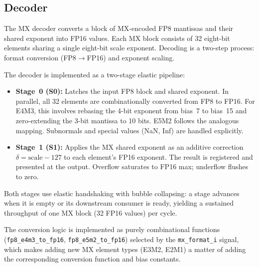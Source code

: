 \subsection{Decoder}
\label{ssec:mx-decoder}

The MX decoder converts a block of MX-encoded FP8 mantissas and their shared
exponent into FP16 values. Each MX block consists of 32 eight-bit elements
sharing a single eight-bit scale exponent. Decoding is a two-step process:
format conversion (FP8$\to$FP16) and exponent scaling.

The decoder is implemented as a two-stage elastic pipeline:

\begin{itemize}
    \item \textbf{Stage~0 (S0):} Latches the input FP8 block and shared
          exponent. In parallel, all 32 elements are combinationally converted
          from FP8 to FP16. For E4M3, this involves rebasing the 4-bit exponent
          from bias~7 to bias~15 and zero-extending the 3-bit mantissa to 10
          bits. E5M2 follows the analogous mapping. Subnormals and special values
          (NaN, Inf) are handled explicitly.
    \item \textbf{Stage~1 (S1):} Applies the MX shared exponent as an additive
          correction $\delta = \text{scale} - 127$ to each element's FP16
          exponent. The result is registered and presented at the output.
          Overflow saturates to FP16 max; underflow flushes to zero.
\end{itemize}

Both stages use elastic handshaking with bubble collapsing: a stage advances
when it is empty or its downstream consumer is ready, yielding a sustained
throughput of one MX block (32 FP16 values) per cycle.


The conversion logic is implemented as purely combinational functions
(\texttt{fp8\_e4m3\_to\_fp16}, \texttt{fp8\_e5m2\_to\_fp16}) selected by the
\texttt{mx\_format\_i} signal, which makes adding new MX element types
(E3M2, E2M1) a matter of adding the corresponding conversion function and
bias constants.



